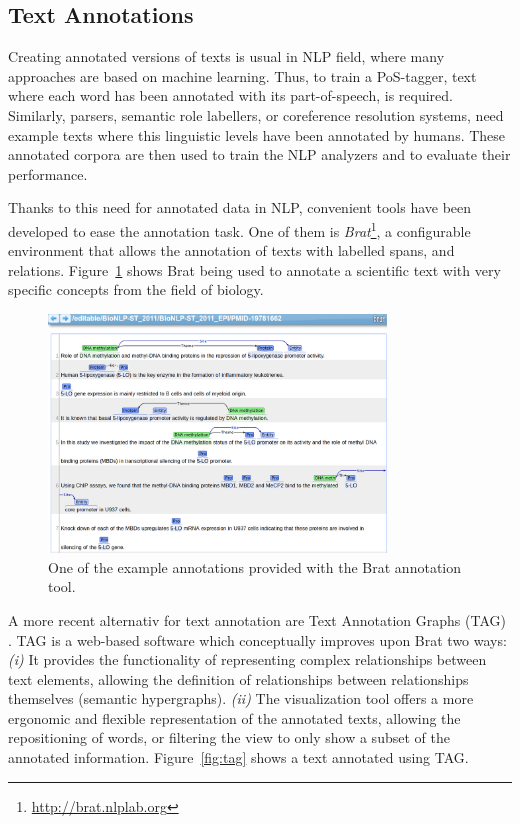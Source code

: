 \subsection{Text Annotations}
\label{sec:background_anns}

Creating annotated versions of texts is usual in NLP field, where many
approaches are based on machine learning. Thus, to train a PoS-tagger, text
where each word has been annotated with its part-of-speech, is required.
Similarly, parsers, semantic role labellers, or coreference resolution systems,
need example texts where this linguistic levels have been annotated by humans.
These annotated corpora are then used to train the NLP analyzers and to
evaluate their performance.

Thanks to this need for annotated data in NLP, convenient tools have been
developed to ease the annotation task. One of them is
\emph{Brat}\cite{stenetorp2012brat}\footnote{\url{http://brat.nlplab.org}}, a
configurable environment that allows the annotation of texts with labelled
spans, and relations. Figure~\ref{fig:brat} shows Brat being used to annotate a
scientific text with very specific concepts from the field of biology.


\begin{figure}[htb]
  \centering
  \includegraphics[width=0.8\textwidth]{figures/brat}
  \caption{One of the example annotations provided with the Brat
    annotation tool.}
  \label{fig:brat}
\end{figure}

A more recent alternativ for text annotation are Text Annotation Graphs (TAG)
\cite{DBLP:journals/corr/abs-1711-00529}. TAG is a web-based software which
conceptually improves upon Brat two ways: \textit{(i)} It provides the
functionality of representing complex relationships between text elements,
allowing the definition of relationships between relationships themselves
(semantic hypergraphs). \textit{(ii)} The visualization tool offers a more
ergonomic and flexible representation of the annotated texts, allowing the
repositioning of words, or filtering the view to only show a subset of the
annotated information. Figure~\ref{fig:tag} shows
a text annotated using TAG.


